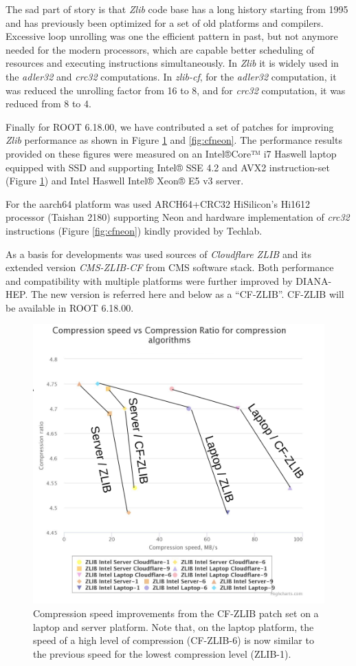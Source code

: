 \documentclass[12pt]{iopart}
\begin{document}
 The sad part of story is that \textit{Zlib} code base has a long history starting from 1995 and has previously been optimized for a set of old platforms and compilers. Excessive loop unrolling was one the efficient pattern in past, but not anymore needed for the modern processors, which are capable better scheduling of resources and executing instructions simultaneously. In \textit{Zlib} it is widely used in the \textit{adler32} and \textit{crc32} computations. In \textit{zlib-cf}, for the \textit{adler32} computation, it was reduced the unrolling factor from 16 to 8, and for \textit{crc32} computation, it was reduced from 8 to 4. 
 
 Finally for ROOT 6.18.00, we have contributed a set of patches for improving \textit{Zlib} performance as shown in Figure \ref{fig:cflaptop} and \ref{fig:cfneon}. The performance results provided on these figures were measured on an Intel®Core™ i7 Haswell laptop equipped with SSD and supporting Intel® SSE 4.2 and AVX2 instruction-set (Figure \ref{fig:cflaptop}) and Intel Haswell  Intel® Xeon® E5 v3 server.
 
 For the aarch64 platform was used ARCH64+CRC32 HiSilicon's Hi1612 processor (Taishan 2180) supporting Neon and hardware implementation of \textit{crc32} instructions (Figure \ref{fig:cfneon}) kindly provided by Techlab. 

As a basis for developments was used sources of \textit{Cloudflare ZLIB} \cite{zlib-cf-sources} and its extended version \textit{CMS-ZLIB-CF} \cite{zlib-cf-cms} from CMS software stack. Both performance and compatibility with multiple platforms were further improved by DIANA-HEP. The new version is referred here and below as a “CF-ZLIB”. CF-ZLIB will be available in ROOT 6.18.00.

\begin{figure}[!ht]
\centering
\includegraphics[width=0.7\linewidth]{acat21.png}
\caption{Compression speed improvements from the CF-ZLIB patch set on a laptop and server platform.  Note that, on the laptop platform, the speed of a high level of compression (CF-ZLIB-6) is now similar to the previous speed for the lowest compression level (ZLIB-1).}
\label{fig:cflaptop}
\end{figure}
\end{document}
